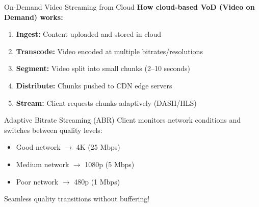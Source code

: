 \documentclass[aspectratio=169,12pt]{beamer}
\begin{document}
\begin{frame}{On-Demand Video Streaming from Cloud}
    \textbf{How cloud-based VoD (Video on Demand) works:}
    
    \vspace{0.3cm}
    \begin{enumerate}
        \item \textbf{Ingest:} Content uploaded and stored in cloud
        \item \textbf{Transcode:} Video encoded at multiple bitrates/resolutions
        \item \textbf{Segment:} Video split into small chunks (2--10 seconds)
        \item \textbf{Distribute:} Chunks pushed to CDN edge servers
        \item \textbf{Stream:} Client requests chunks adaptively (DASH/HLS)
    \end{enumerate}
    
    \vspace{0.3cm}
    \begin{block}{Adaptive Bitrate Streaming (ABR)}
        Client monitors network conditions and switches between quality levels:
        \begin{itemize}
            \item Good network $\rightarrow$ 4K (25 Mbps)
            \item Medium network $\rightarrow$ 1080p (5 Mbps)
            \item Poor network $\rightarrow$ 480p (1 Mbps)
        \end{itemize}
        Seamless quality transitions without buffering!
    \end{block}
\end{frame}
\end{document}
